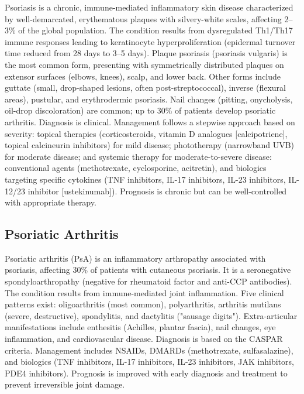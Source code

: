 Psoriasis is a chronic, immune-mediated inflammatory skin disease characterized by well-demarcated, erythematous plaques with silvery-white scales, affecting 2--3\% of the global population. The condition results from dysregulated Th1/Th17 immune responses leading to keratinocyte hyperproliferation (epidermal turnover time reduced from 28 days to 3--5 days). Plaque psoriasis (psoriasis vulgaris) is the most common form, presenting with symmetrically distributed plaques on extensor surfaces (elbows, knees), scalp, and lower back. Other forms include guttate (small, drop-shaped lesions, often post-streptococcal), inverse (flexural areas), pustular, and erythrodermic psoriasis. Nail changes (pitting, onycholysis, oil-drop discoloration) are common; up to 30\% of patients develop psoriatic arthritis. Diagnosis is clinical. Management follows a stepwise approach based on severity: topical therapies (corticosteroids, vitamin D analogues [calcipotriene], topical calcineurin inhibitors) for mild disease; phototherapy (narrowband UVB) for moderate disease; and systemic therapy for moderate-to-severe disease: conventional agents (methotrexate, cyclosporine, acitretin), and biologics targeting specific cytokines (TNF inhibitors, IL-17 inhibitors, IL-23 inhibitors, IL-12/23 inhibitor [ustekinumab]). Prognosis is chronic but can be well-controlled with appropriate therapy.

\subsection{Psoriatic Arthritis}
\label{sec:skin:Psoriatic Arthritis}
Psoriatic arthritis (PsA) is an inflammatory arthropathy associated with psoriasis, affecting 30\% of patients with cutaneous psoriasis. It is a seronegative spondyloarthropathy (negative for rheumatoid factor and anti-CCP antibodies). The condition results from immune-mediated joint inflammation. Five clinical patterns exist: oligoarthritis (most common), polyarthritis, arthritis mutilans (severe, destructive), spondylitis, and dactylitis ("sausage digits"). Extra-articular manifestations include enthesitis (Achilles, plantar fascia), nail changes, eye inflammation, and cardiovascular disease. Diagnosis is based on the CASPAR criteria. Management includes NSAIDs, DMARDs (methotrexate, sulfasalazine), and biologics (TNF inhibitors, IL-17 inhibitors, IL-23 inhibitors, JAK inhibitors, PDE4 inhibitors). Prognosis is improved with early diagnosis and treatment to prevent irreversible joint damage.

